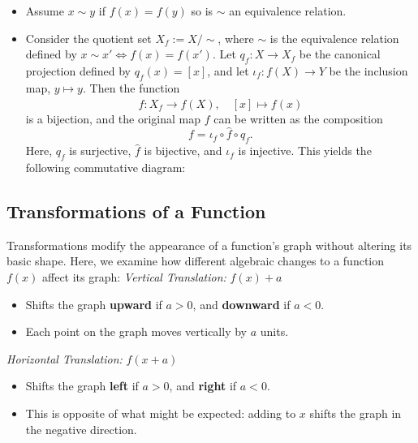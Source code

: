 \begin{itemize}[label =\(-\)]

	\item Assume \(x \sim y \) if \(f(x)= f(y)\) so is \(\sim\) an equivalence relation.

	\item Consider the quotient set \( X_f := X/\sim \), where \( \sim \) is the equivalence relation defined by \( x \sim x' \iff f(x) = f(x') \). Let \( q_f : X \to X_f \) be the canonical projection defined by \( q_f(x) = [x] \), and let \( \iota_f : f(X) \to Y \) be the inclusion map, \( y \mapsto y \). Then the function
	      \[
		      \hat{f} : X_f \to f(X), \quad [x] \mapsto f(x)
	      \]
	      is a bijection, and the original map \( f \) can be written as the composition
	      \[
		      f = \iota_f \circ \hat{f} \circ q_f.
	      \]
	      Here, \( q_f \) is surjective, \( \hat{f} \) is bijective, and \( \iota_f \) is injective. This yields the following commutative diagram:
	      \begin{center}
	      \end{center}

\end{itemize}

\subsection{Transformations of a Function}

Transformations modify the appearance of a function's graph without altering its basic shape.
Here, we examine how different algebraic changes to a function \( f(x) \) affect its graph:
\newline
	 \emph{Vertical Translation:} \( f(x) + a \)
	      \begin{itemize}[label=\(-\)]
		      \item Shifts the graph \textbf{upward} if \( a > 0 \), and \textbf{downward} if \( a < 0 \).
		      \item Each point on the graph moves vertically by \( a \) units.
	      \end{itemize}

	\emph{Horizontal Translation:} \( f(x + a) \)
	      \begin{itemize}[label=\(-\)]
		      \item Shifts the graph \textbf{left} if \( a > 0 \), and \textbf{right} if \( a < 0 \).
		      \item This is opposite of what might be expected: adding to \( x \) shifts the graph in the negative direction.
	      \end{itemize}

